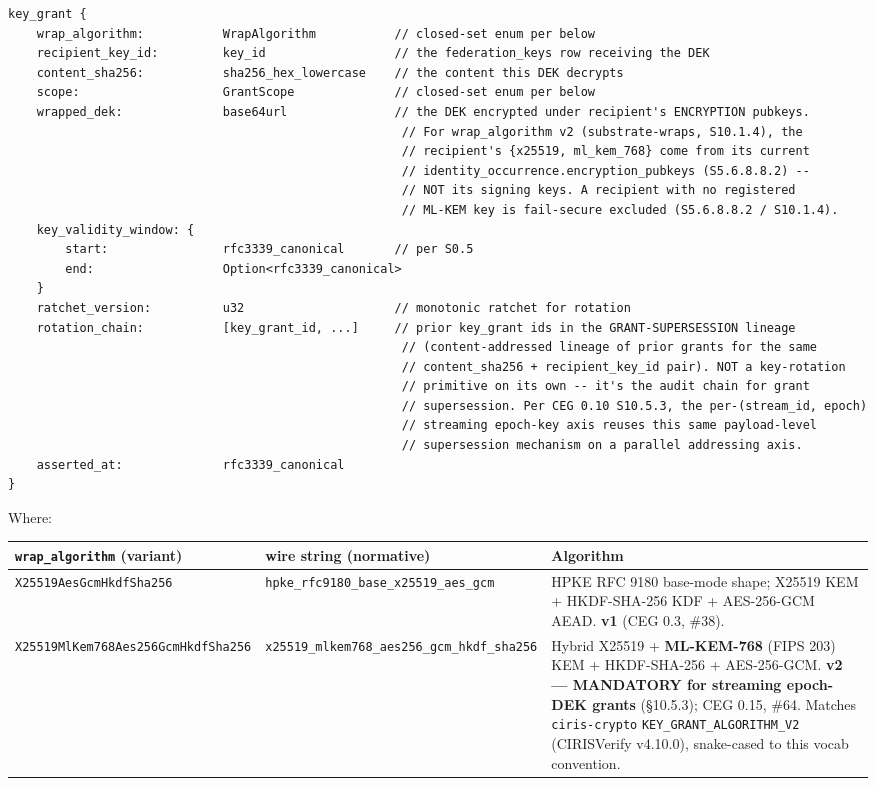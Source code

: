 \documentclass[11pt]{article}
\begin{document}
\begin{lstlisting}
key_grant {
    wrap_algorithm:           WrapAlgorithm           // closed-set enum per below
    recipient_key_id:         key_id                  // the federation_keys row receiving the DEK
    content_sha256:           sha256_hex_lowercase    // the content this DEK decrypts
    scope:                    GrantScope              // closed-set enum per below
    wrapped_dek:              base64url               // the DEK encrypted under recipient's ENCRYPTION pubkeys.
                                                       // For wrap_algorithm v2 (substrate-wraps, S10.1.4), the
                                                       // recipient's {x25519, ml_kem_768} come from its current
                                                       // identity_occurrence.encryption_pubkeys (S5.6.8.8.2) --
                                                       // NOT its signing keys. A recipient with no registered
                                                       // ML-KEM key is fail-secure excluded (S5.6.8.8.2 / S10.1.4).
    key_validity_window: {
        start:                rfc3339_canonical       // per S0.5
        end:                  Option<rfc3339_canonical>
    }
    ratchet_version:          u32                     // monotonic ratchet for rotation
    rotation_chain:           [key_grant_id, ...]     // prior key_grant ids in the GRANT-SUPERSESSION lineage
                                                       // (content-addressed lineage of prior grants for the same
                                                       // content_sha256 + recipient_key_id pair). NOT a key-rotation
                                                       // primitive on its own -- it's the audit chain for grant
                                                       // supersession. Per CEG 0.10 S10.5.3, the per-(stream_id, epoch)
                                                       // streaming epoch-key axis reuses this same payload-level
                                                       // supersession mechanism on a parallel addressing axis.
    asserted_at:              rfc3339_canonical
}
\end{lstlisting}

Where:


{\footnotesize
\begin{longtable}{|p{5.33cm}|p{5.33cm}|p{5.33cm}|}\hline
\textbf{\texttt{wrap\_algorithm} (variant)} & \textbf{wire string (normative)} & \textbf{Algorithm} \\ \hline\endhead
\texttt{X25519AesGcmHkdfSha256} & \texttt{hpke\_rfc9180\_base\_x25519\_aes\_gcm} & HPKE RFC 9180 base-mode shape; X25519 KEM + HKDF-SHA-256 KDF + AES-256-GCM AEAD. \textbf{v1} (CEG 0.3, \#38). \\ \hline
\texttt{X25519MlKem768Aes256GcmHkdfSha256} & \texttt{x25519\_mlkem768\_aes256\_gcm\_hkdf\_sha256} & Hybrid X25519 + \textbf{ML-KEM-768} (FIPS 203) KEM + HKDF-SHA-256 + AES-256-GCM. \textbf{v2 — MANDATORY for streaming epoch-DEK grants} (§10.5.3); CEG 0.15, \#64. Matches \texttt{ciris-crypto} \texttt{KEY\_GRANT\_ALGORITHM\_V2} (CIRISVerify v4.10.0), snake-cased to this vocab convention. \\ \hline
\end{longtable}}
\end{document}
